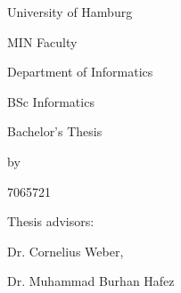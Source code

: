 \begin{titlepage}
    \centering
    University of Hamburg \par
    MIN Faculty \par
    Department of Informatics \par
    BSc Informatics \par
    \vspace{6\baselineskip}
    {\Large Bachelor's Thesis\par}
    {\Huge \thetitle \par}
    \vspace{6\baselineskip}
    by\par
    {\Large \theauthor \par 7065721 \par}
    \vfill
    Thesis advisors:\par
    {\large Dr. Cornelius Weber, \par Dr. Muhammad Burhan Hafez}
\end{titlepage}
